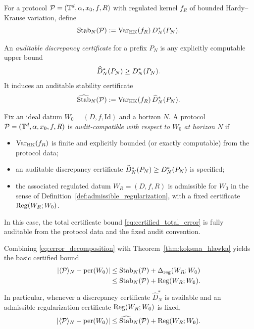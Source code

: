 \begin{definition}
\label{def:stabN}
For a protocol $\mathcal{P}=(\mathbb{T}^d,\alpha,x_0,f,R)$ with regulated kernel $f_R$ of bounded Hardy--Krause variation, define
\[
\mathrm{Stab}_N(\mathcal{P})
:=\mathrm{Var}_{\mathrm{HK}}(f_R)\,D_N^\ast(P_N).
\]
\end{definition}

\begin{definition}
\label{def:discrepancy_certificate}
An \emph{auditable discrepancy certificate} for a prefix $P_N$ is any explicitly computable upper bound
\[
\widehat D_N^\ast(P_N)\ge D_N^\ast(P_N).
\]
It induces an auditable stability certificate
\[
\widehat{\mathrm{Stab}}_N(\mathcal{P})
:=\mathrm{Var}_{\mathrm{HK}}(f_R)\,\widehat D_N^\ast(P_N).
\]
\end{definition}

\begin{definition}
\label{def:audit_compatible_protocol}
Fix an ideal datum $W_0=(D,f,\mathrm{Id})$ and a horizon $N$.
A protocol $\mathcal{P}=(\mathbb{T}^d,\alpha,x_0,f,R)$ is \emph{audit-compatible with respect to $W_0$ at horizon $N$} if
\begin{itemize}
\item $\mathrm{Var}_{\mathrm{HK}}(f_R)$ is finite and explicitly bounded (or exactly computable) from the protocol data;
\item an auditable discrepancy certificate $\widehat D_N^\ast(P_N)\ge D_N^\ast(P_N)$ is specified;
\item the associated regulated datum $W_R=(D,f,R)$ is admissible for $W_0$ in the sense of Definition~\ref{def:admissible_regularization}, with a fixed certificate $\mathrm{Reg}(W_R;W_0)$.
\end{itemize}
In this case, the total certificate bound \eqref{eq:certified_total_error} is fully auditable from the protocol data and the fixed audit convention.
\end{definition}

Combining \eqref{eq:error_decomposition} with Theorem~\ref{thm:koksma_hlawka} yields the basic certified bound
\begin{equation}
\label{eq:certified_total_error}
\begin{aligned}
\left|\langle \mathcal{P} \rangle_N-\mathrm{per}(W_0)\right|
&\le \mathrm{Stab}_N(\mathcal{P})+\Delta_{\mathrm{reg}}(W_R;W_0)\\
&\le \mathrm{Stab}_N(\mathcal{P})+\mathrm{Reg}(W_R;W_0).
\end{aligned}
\end{equation}
In particular, whenever a discrepancy certificate $\widehat D_N^\ast$ is available and an admissible regularization certificate $\mathrm{Reg}(W_R;W_0)$ is fixed,
\[
\left|\langle \mathcal{P} \rangle_N-\mathrm{per}(W_0)\right|
\le \widehat{\mathrm{Stab}}_N(\mathcal{P})+\mathrm{Reg}(W_R;W_0).
\]

